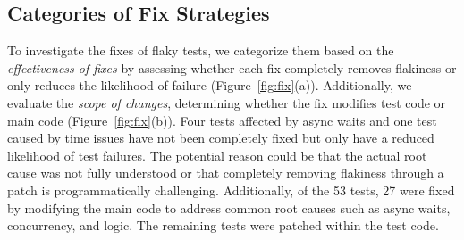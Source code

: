 \subsection{Categories of Fix Strategies}
To investigate the fixes of flaky tests, we categorize them based on the \textit{effectiveness of fixes} by assessing whether each fix completely removes flakiness or only reduces the likelihood of failure (Figure~\ref{fig:fix}(a)). Additionally, we evaluate the \textit{scope of changes}, determining whether the fix modifies test code or main code (Figure~\ref{fig:fix}(b)).
Four tests affected by async waits and one test caused by time issues have not been completely fixed but only have a reduced likelihood of test failures. The potential reason could be that the actual root cause was not fully understood or that completely removing flakiness through a patch is programmatically challenging.
Additionally, of the 53 tests, 27 were fixed by modifying the main code to address common root causes such as async waits, concurrency, and logic. The remaining tests were patched within the test code. 


